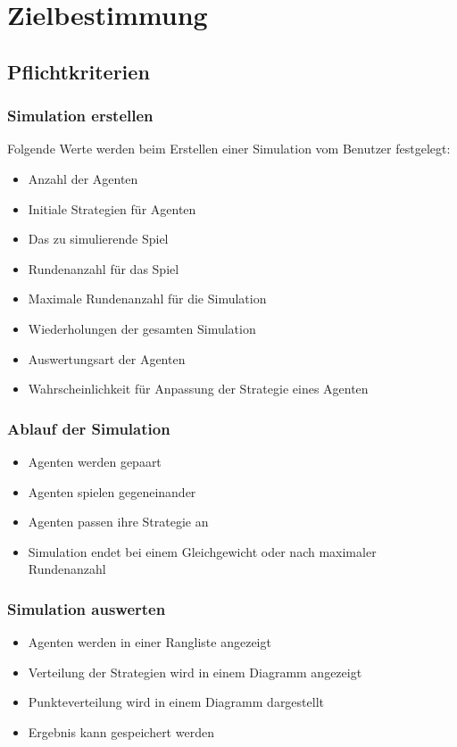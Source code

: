 \section{Zielbestimmung}

\subsection{Pflichtkriterien}

\subsubsection{Simulation erstellen}
Folgende Werte werden beim Erstellen einer Simulation vom Benutzer festgelegt:
\begin{itemize}
\item Anzahl der Agenten 
\item Initiale Strategien für Agenten
\item Das zu simulierende Spiel
\item Rundenanzahl für das Spiel
\item Maximale Rundenanzahl für die Simulation
\item Wiederholungen der gesamten Simulation
\item Auswertungsart der Agenten
\item Wahrscheinlichkeit für Anpassung der Strategie eines Agenten
\end{itemize}

\subsubsection{Ablauf der Simulation}
\begin{itemize}
\item Agenten werden gepaart
\item Agenten spielen gegeneinander
\item Agenten passen ihre Strategie an
\item Simulation endet bei einem Gleichgewicht oder nach maximaler Rundenanzahl
\end{itemize}

\subsubsection{Simulation auswerten}
\begin{itemize}
\item Agenten werden in einer Rangliste angezeigt
\item Verteilung der Strategien wird in einem Diagramm angezeigt
\item Punkteverteilung wird in einem Diagramm dargestellt
\item Ergebnis kann gespeichert werden
\end{itemize}

